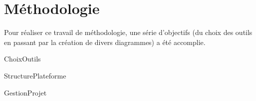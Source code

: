 \chapter{Méthodologie}

Pour réaliser ce travail de méthodologie, une série d’objectifs (du choix des outils en passant par la création de divers diagrammes) a été accomplie. 

{ChoixOutils}

{StructurePlateforme}

{GestionProjet}
